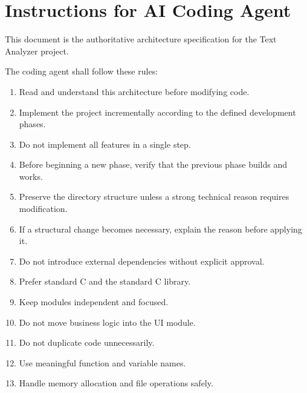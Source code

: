 \documentclass[12pt,a4paper]{article}
\begin{document}

\section{Instructions for AI Coding Agent}

This document is the authoritative architecture specification for the
Text Analyzer project.

The coding agent shall follow these rules:

\begin{enumerate}

    \item Read and understand this architecture before modifying code.

    \item Implement the project incrementally according to the defined
    development phases.

    \item Do not implement all features in a single step.

    \item Before beginning a new phase, verify that the previous phase
    builds and works.

    \item Preserve the directory structure unless a strong technical
    reason requires modification.

    \item If a structural change becomes necessary, explain the reason
    before applying it.

    \item Do not introduce external dependencies without explicit
    approval.

    \item Prefer standard C and the standard C library.

    \item Keep modules independent and focused.

    \item Do not move business logic into the UI module.

    \item Do not duplicate code unnecessarily.

    \item Use meaningful function and variable names.

    \item Handle memory allocation and file operations safely.


\end{enumerate}
\end{document}
